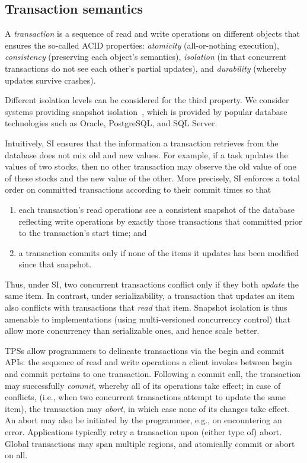 \subsection{Transaction semantics} \label{ssec:transactions}

A \emph{transaction} is a sequence of read and write operations on different objects that ensures the so-called ACID properties:
\emph{atomicity} (all-or-nothing execution), \emph{consistency} (preserving each object's semantics), 
\emph{isolation} (in that concurrent transactions do not see each other's partial updates), and 
\emph{durability} (whereby updates survive crashes).

Different isolation levels can be considered for the third property. We consider systems providing  
snapshot isolation~\cite{DBLP:conf/sigmod/BerensonBGMOO95}, 
which is provided by popular database technologies such as Oracle, PostgreSQL, and SQL Server.

Intuitively, SI ensures that the information a transaction retrieves from the database 
does not mix old and new values. For example, if a task updates the values of two stocks, then no other transaction may observe the old value of one of these stocks and the new value of the other. 
%
More precisely, SI enforces a total order on committed transactions according to their commit times so that 
\begin{enumerate}
    \setlength{\itemsep}{0pt}
    \setlength{\parskip}{0pt}
    \setlength{\parsep}{2pt}  
\item
each transaction's read operations see a consistent snapshot of the database reflecting write operations by
 exactly those transactions that committed prior to the transaction's start time; and 
\item
 a transaction commits only if none of the items it updates has been modified since that snapshot.
 \end{enumerate}
Thus, under SI, two concurrent transactions conflict only if they both \emph{update} the same item.  
In contrast, under serializability, a transaction that updates an item also conflicts with transactions that \emph{read} that item. Snapshot isolation is thus amenable to implementations (using multi-versioned concurrency control) that 
allow more concurrency than serializable ones, and hence scale better.

TPSs allow programmers to  delineate transactions via the begin and commit APIs: 
the sequence of read and write operations a client invokes between begin and  commit pertains to one transaction.
Following a commit call, the transaction may successfully \emph{commit}, whereby all of its operations take effect;
in case of conflicts, (i.e., when two concurrent transactions attempt to update the same item), the transaction may
\emph{abort}, in which case none of its changes take effect. An abort may also be initiated by the programmer, e.g., 
on encountering an error. Applications typically retry a transaction upon (either type of) abort. 
Global transactions may span multiple regions, and atomically commit or abort on all. 
